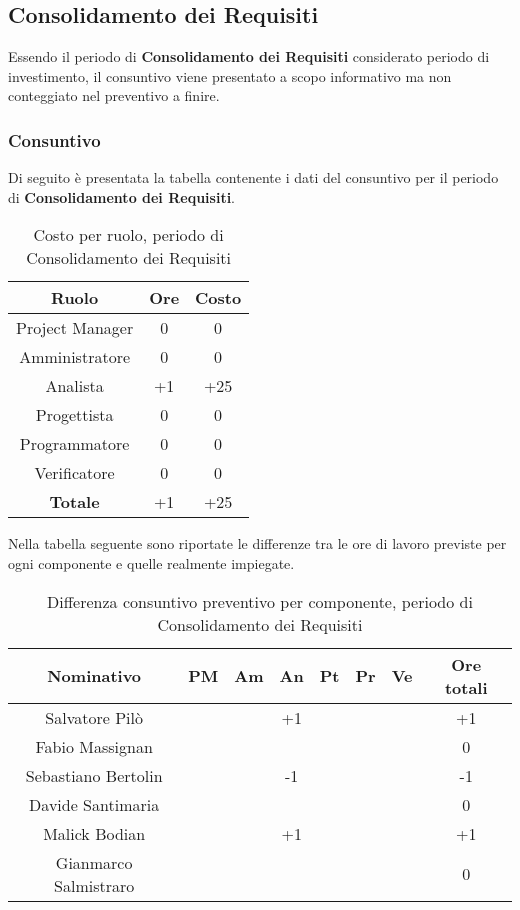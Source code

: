 	\subsection{Consolidamento dei Requisiti}
	Essendo il periodo di \textbf{Consolidamento dei Requisiti} considerato periodo di investimento, il consuntivo viene presentato a scopo informativo ma non conteggiato nel preventivo a finire.
		\subsubsection{Consuntivo}
		Di seguito è presentata la tabella contenente i dati del consuntivo per il periodo di \textbf{Consolidamento dei Requisiti}.
	\begin{table}[H]
		\centering
		\begin{tabular}{|c|c|c|}
			\hline
			\textbf{Ruolo}		& \textbf{Ore}	& \textbf{Costo} \\
			\hline
			Project Manager		& 0			& 0	\\
			Amministratore		& 0			& 0	\\
			Analista			& +1		& +25 \\
			Progettista			& 0			& 0	\\
			Programmatore		& 0			& 0	\\
			Verificatore		& 0			& 0	\\
			\hline
			\textbf{Totale}		& +1		& +25 \\
			\hline
		\end{tabular}
		\caption{Costo per ruolo, periodo di Consolidamento dei Requisiti}
	\end{table}
	Nella tabella seguente sono riportate le differenze tra le ore di lavoro previste per ogni componente e quelle realmente impiegate.
	\begin{table}[H]
		\centering
		\begin{tabular}{|c|c|c|c|c|c|c|c|}
			\hline
			\textbf{Nominativo}		& \textbf{PM}	& \textbf{Am}	& \textbf{An}	& \textbf{Pt}	& \textbf{Pr}	& \textbf{Ve}	& \textbf{Ore totali}     \\
			\hline
			Salvatore Pilò			& 		& 		& +1	&		&		&		& +1 \\
			Fabio Massignan			&		& 		&		&		&		& 		& 0	 \\
			Sebastiano Bertolin		&		& 	 	& -1	&		&		&		& -1 \\
			Davide Santimaria		&		& 		& 		&		&		&		& 0	 \\
			Malick Bodian			& 		&		& +1	&		&		& 		& +1 \\
			Gianmarco Salmistraro	&		&		& 	 	&		&		& 		& 0	 \\
			\hline
		\end{tabular}
		\caption{Differenza consuntivo preventivo per componente, periodo di Consolidamento dei Requisiti}
	\end{table}
